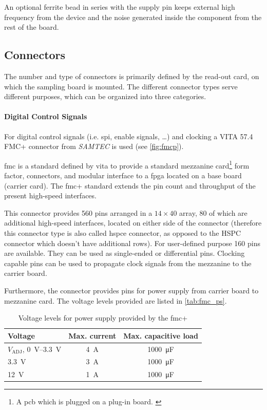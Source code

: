 An optional ferrite bead in series with the supply pin keeps external high frequency from the device and the noise generated inside the component from the rest of the board. \cite{decouple}


\subsection{Connectors}\label{sec:connectors}
The number and type of connectors is primarily defined by the read-out card, on which the sampling board is mounted.
The different connector types serve different purposes, which can be organized into three categories.

\paragraph{Digital Control Signals}
For digital control signals (i.e. \gls{spi}, enable signals, \ldots) and clocking a VITA 57.4 FMC+ connector from \textit{SAMTEC} is used (see \autoref{fig:fmcp}). 

\gls{fmc} is a standard defined by \gls{vita} to provide a standard mezzanine card\footnote{A \gls{pcb} which is plugged on a plug-in board. \cite{mezzanine}} form factor, connectors, and modular interface to a \gls{fpga} located on a base board (carrier card). \cite{Seelam2009}
The \gls{fmc}+ standard extends the pin count and throughput of the present high-speed interfaces. 

This connector provides 560 pins arranged in a $14\times40$ array, 80 of which are additional high-speed interfaces, located on either side of the connector (therefore this connector type is also called \gls{hspce} connector, as opposed to the HSPC connector which doesn't have additional rows).
For user-defined purpose 160 pins are available. 
They can be used as single-ended or differential pins.
Clocking capable pins can be used to propagate clock signals from the mezzanine to the carrier board. 

Furthermore, the connector provides pins for power supply from carrier board to mezzanine card. \cite{fmc} The voltage levels provided are listed in \autoref{tab:fmc_ps}.



\begin{table}[tbh]
	\caption[FMC+ Voltages]{Voltage levels for power supply provided by the \gls{fmc}+}
	\label{tab:fmc_ps}
		\centering
		\begin{tabularx}{\textwidth}{Xcc}
			\toprule
			\textbf{Voltage} & \textbf{Max. current} & \textbf{Max. capacitive load}\\
			\midrule
			$V_\text{ADJ}$, \SIrange{0}{3.3}{\volt} & \SI{4}{\ampere} & \SI{1000}{\micro \farad}\\
			\SI{3.3}{\volt} & \SI{3}{\ampere} & \SI{1000}{\micro \farad}\\
			\SI{12}{\volt} & \SI{1}{\ampere} & \SI{1000}{\micro \farad}\\
			\bottomrule
		\end{tabularx}
\end{table}


